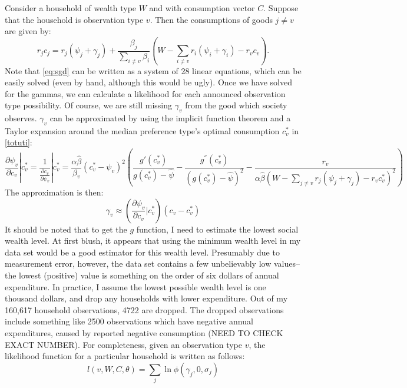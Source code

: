 \documentclass{article}
\begin{document}
Consider a household of wealth type $W$ and with consumption vector $C$.  
Suppose that the household is observation type $v$.
Then the consumptions of goods $j\neq v$ are given by:
\begin{equation}
	\label{eq:sgd}
	r_jc_j = r_j(\psi_j + \gamma_j) + \frac{\beta_j}{\sum_{i\neq v}\beta_i}  \left(W-\sum_{i \neq v} r_i\left(\psi_i + \gamma_i\right) - r_v c_v\right).
\end{equation}
Note that \eqref{eq:sgd} can be written as a system of 28 linear equations, which can be easily solved (even by hand, although this would be ugly).
Once we have solved for the gammas, we can calculate a likelihood for each announced observation type possibility.
Of course, we are still missing $\gamma_v$ from the good which society observes.
$\gamma_v$ can be approximated by using the implicit function theorem and a Taylor expansion around the median preference type's optimal consumption $c_v^*$ in \eqref{totuti}:
\begin{equation}
	\frac{\partial \psi_v}{\partial c_v}|c_v^* = \frac{1}{\frac{\partial c_v}{\partial \psi_v}}|c_v^*=\frac{\alpha \hat{\beta}}{\beta_v}\left(c_v^*-\psi_v\right)^2 \left( \frac{g'(c_v^*)}{g(c_v^*)-\hat{\psi}} - \frac{g^{''}(c_v^*)}{\left(g(c_v^*) -\hat{\psi}\right)^2}-\frac{r_v}{\alpha \hat{\beta}(W-\sum_{j\neq v} r_j (\psi_j + \gamma_j) -r_v c_v^*)^2}\right)
\end{equation}
The approximation is then:
\begin{equation}
	\gamma_v \approx \left(\frac{\partial \psi_v}{\partial c_v}|c_v^*\right)\left(c_v - c_v^*\right)
\end{equation}
It should be noted that to get the $g$ function, I need to estimate the lowest social wealth level. 
At first blush, it appears that using the minimum wealth level in my data set would be a good estimator for this wealth level.
Presumably due to measurement error, however, the data set contains a few unbelievably low values--the lowest (positive) value is something on the order of six dollars of annual expenditure.
In practice, I assume the lowest possible wealth level is one thousand dollars, and drop any households with lower expenditure.
Out of my 160,617 household observations, 4722 are dropped.
The dropped observations include something like 2500 observations which have negative annual expenditures, caused by reported negative consumption (NEED TO CHECK EXACT NUMBER).
For completeness, given an observation type $v$, the likelihood function for a particular household is written as follows:
\begin{equation}
	\label{lik1}
	l(v,W,C,\theta) = \sum_{j} \ln \phi(\gamma_j,0,\sigma_j)
\end{equation}
\end{document}
